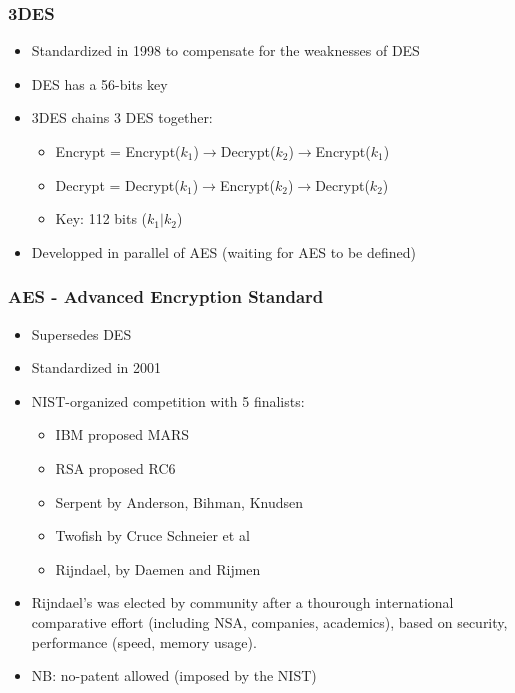\documentclass[
hyperref={pdfpagelabels=false}
,xcolor=table
]
{beamer}
\begin{document}



\begin{frame}
  \frametitle{3DES}

  \begin{itemize}
  \item Standardized in 1998 to compensate for the weaknesses of DES
  \item DES has a 56-bits key
  \item 3DES chains 3 DES together:
    \begin{itemize}
    \item Encrypt =  Encrypt($k_1$)$\rightarrow$Decrypt($k_2$)$\rightarrow$Encrypt($k_1$)
    \item Decrypt = Decrypt($k_1$)$\rightarrow$Encrypt($k_2$)$\rightarrow$Decrypt($k_2$)
    \item Key: 112 bits ($k_1|k_2$)
    \end{itemize}
  \item Developped in parallel of AES (waiting for AES to be defined)
  \end{itemize}
 
\end{frame}




\begin{frame}
  \frametitle{AES - Advanced Encryption Standard}
  \begin{itemize}
  \item Supersedes DES
  \item Standardized in 2001
  \item NIST-organized competition with 5 finalists:
    \begin{itemize}
    \item IBM proposed MARS
    \item RSA proposed RC6
    \item Serpent by Anderson, Bihman, Knudsen
    \item Twofish by Cruce Schneier et al
    \item Rijndael, by Daemen and Rijmen
    \end{itemize}
  \item Rijndael's was elected by community after a thourough international comparative effort (including NSA, companies, academics), based on security, performance (speed, memory usage).
  \item NB: no-patent allowed (imposed by the NIST)
  \end{itemize}
\end{frame}
\end{document}
